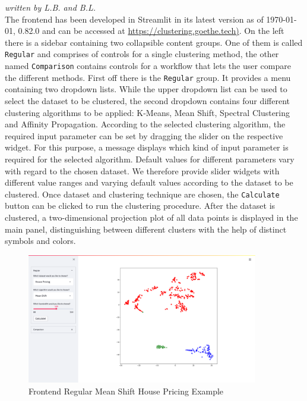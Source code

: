 \textit{written by L.B. and B.L.}\\

The frontend has been developed in Streamlit \cite{streamlit2018} in its latest version as of \today, 0.82.0 and can be accessed at \url{https://clustering.goethe.tech)}.
On the left there is a sidebar containing two collapsible content groups. One of them is called \texttt{Regular} and comprises of controls for a single clustering method, the other named \texttt{Comparison} contains controls for a workflow that lets the user compare the different methods.
First off there is the \texttt{Regular} group. It provides a menu containing two dropdown lists. While the upper dropdown list can be used to select the dataset to be clustered, the second dropdown contains four different clustering algorithms to be applied: K-Means, Mean Shift, Spectral Clustering and Affinity Propagation. According to the selected clustering algorithm, the required input parameter can be set by dragging the slider on the respective widget. For this purpose, a message displays which kind of input parameter is required for the selected algorithm. 
Default values for different parameters vary with regard to the chosen dataset. We therefore provide slider widgets with different value ranges and varying default values according to the dataset to be clustered.
Once dataset and clustering technique are chosen, the \texttt{Calculate} button can be clicked to run the clustering procedure.
After the dataset is clustered, a two-dimensional projection plot of all data points is displayed in the main panel, distinguishing between different clusters with the help of distinct symbols and colors.

\begin{figure}[H]
%
\begin{center}
\includegraphics[width=0.9\textwidth]{images/frontend_regular.png}
\caption{Frontend Regular Mean Shift House Pricing Example}
\end{center}
\label{img:frontend_screenshot_regular}
\end{figure}

